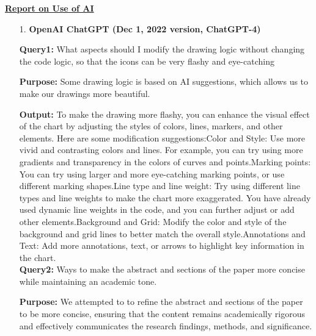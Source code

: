 \documentclass[12pt]{article}  %
\begin{document}
\begin{subappendices}
\begin{lstlisting}[language=Python, name={LightGBM.py}]
\end{lstlisting}


\clearpage
\begin{letter}{\centering \underline{\textbf{Report on Use of AI}}}
	
	\begin{itemize}
		\setlength{\parsep}{0ex} %
		\setlength{\topsep}{2ex} %
		\setlength{\itemsep}{1ex} %
		\item[1.]  \textbf{OpenAI ChatGPT (Dec 1, 2022 version, ChatGPT-4)}
		
		
		
		\subitem\textbf{Query1: }What aspects should I modify the drawing logic without changing the code logic, so that the icons can be very flashy and eye-catching
		
		\subitem\textbf{Purpose: }Some drawing logic is based on AI suggestions, which allows us to make our drawings more beautiful.
		
		\subitem\textbf{Output: }To make the drawing more flashy, you can enhance the visual effect of the chart by adjusting the styles of colors, lines, markers, and other elements. Here are some modification suggestions:Color and Style: Use more vivid and contrasting colors and lines. For example, you can try using more gradients and transparency in the colors of curves and points.Marking points: You can try using larger and more eye-catching marking points, or use different marking shapes.Line type and line weight: Try using different line types and line weights to make the chart more exaggerated. You have already used dynamic line weights in the code, and you can further adjust or add other elements.Background and Grid: Modify the color and style of the background and grid lines to better match the overall style.Annotations and Text: Add more annotations, text, or arrows to highlight key information in the chart.\\
		
		\subitem\textbf{Query2: }Ways to make the abstract and sections of the paper more concise while maintaining an academic tone.
		
		\subitem\textbf{Purpose: }We attempted to to refine the abstract and sections of the paper to be more concise, ensuring that the content remains academically rigorous and effectively communicates the research findings, methods, and significance.
		

\end{itemize}
\end{letter}
\end{subappendices}
\end{document}
